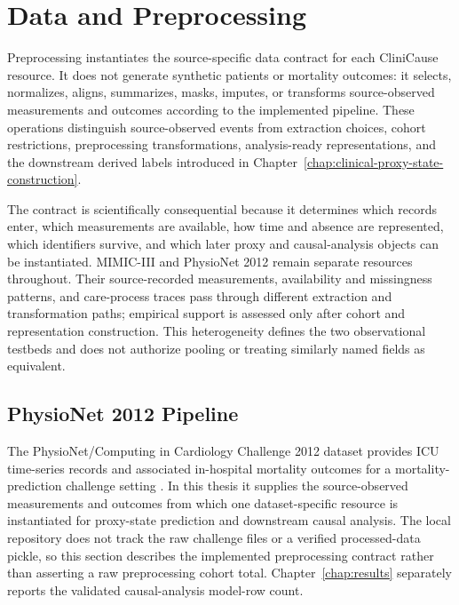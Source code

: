 \chapter{Data and Preprocessing}
\label{chap:data-preprocessing}

Preprocessing instantiates the source-specific data contract for each CliniCause resource.  It does not generate synthetic patients or mortality outcomes: it selects, normalizes, aligns, summarizes, masks, imputes, or transforms source-observed measurements and outcomes according to the implemented pipeline.  These operations distinguish source-observed events from extraction choices, cohort restrictions, preprocessing transformations, analysis-ready representations, and the downstream derived labels introduced in Chapter~\ref{chap:clinical-proxy-state-construction}.

The contract is scientifically consequential because it determines which records enter, which measurements are available, how time and absence are represented, which identifiers survive, and which later proxy and causal-analysis objects can be instantiated.  MIMIC-III and PhysioNet 2012 remain separate resources throughout.  Their source-recorded measurements, availability and missingness patterns, and care-process traces pass through different extraction and transformation paths; empirical support is assessed only after cohort and representation construction.  This heterogeneity defines the two observational testbeds and does not authorize pooling or treating similarly named fields as equivalent.

\section{PhysioNet 2012 Pipeline}
\label{sec:data-preprocessing:physionet-2012-pipeline}

The PhysioNet/Computing in Cardiology Challenge 2012 dataset provides ICU time-series records and associated in-hospital mortality outcomes for a mortality-prediction challenge setting \cite{silva2012physionet}.  In this thesis it supplies the source-observed measurements and outcomes from which one dataset-specific resource is instantiated for proxy-state prediction and downstream causal analysis.  The local repository does not track the raw challenge files or a verified processed-data pickle, so this section describes the implemented preprocessing contract rather than asserting a raw preprocessing cohort total.  Chapter~\ref{chap:results} separately reports the validated causal-analysis model-row count.

